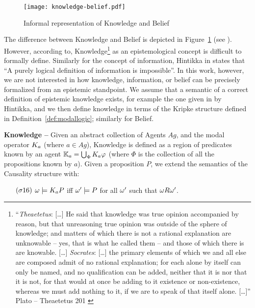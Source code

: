 \begin{figure}[t]
	\centering
	\texttt{[image: knowledge-belief.pdf]}
	\caption{Informal representation of Knowledge and Belief}
	\label{fig:knowledge-belief}
\end{figure}

The difference between Knowledge and Belief is depicted in
Figure~\ref{fig:knowledge-belief} (see \autocite{wiki-knowledgebelief}).  However,
according to\autocite{Gettier2012knowledge},
Knowledge\footnote{``\emph{Theaetetus}: [\ldots] He said that knowledge was
true opinion accompanied by reason, but that unreasoning true opinion was
outside of the sphere of knowledge; and matters of which there is not a
rational explanation are unknowable -- yes, that is what he called them -- and
those of which there is are knowable. [\ldots] \emph{Socrates}: [\ldots] the
primary elements of which we and all else are composed admit of no rational
explanation; for each alone by itself can only be named, and no qualification
can be added, neither that it is nor that it is not, for that would at once be
adding to it existence or non-existence, whereas we must add nothing to it, if
we are to speak of that itself alone.  [\ldots]'' Plato -- Theaetetus 201
\autocite{Plato1914Plato}} as an epistemological concept is difficult to formally define. 
Similarly for the concept of information, Hintikka in \autocite{Hintikka1993Information}
states that ``A purely logical definition of information is impossible''.
In this work, however, we are not interested in how knowledge, information, or
belief can be precisely formalized from an epistemic standpoint.  We assume
that a semantic of a correct definition of epistemic knowledge exists, for
example the one given in\autocite{Hintikka1962knowledge} by Hintikka, and we
then define knowledge in terms of the Kripke structure defined in
Definition~\ref{def:modallogic}; similarly for Belief.

\begin{definition}{\bf Knowledge --}\label{def:knowledge}
Given an abstract collection of Agents $Ag$, and the modal operator
	$K_{a}$ (where $a\in Ag$), Knowledge is defined as a region 
	of predicates known by an agent $\mathbb{K}_{a}=\bigcup_\Phi K_{a}\varphi$ 
	(where $\Phi$ is the collection of all the propositions known by $a$).
	Given a proposition $P$, we extend the semantics of the Causality structure with:
	\begin{enumerate}[noitemsep]
		\item[$(\sigma16)$] $\omega\models K_{a}P$ iff
			$\omega'\models P$ for all $\omega'$ such that
			$\omega R\omega'$.
	\end{enumerate}
\end{definition}

